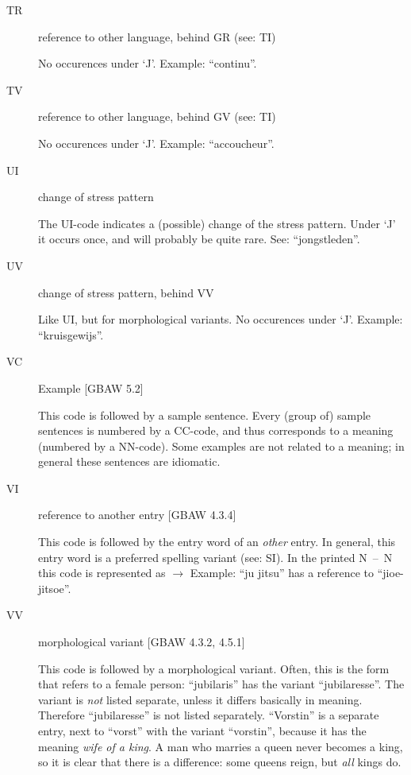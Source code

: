 \begin{description}
   \item [TR] reference to other language, behind GR (see: TI)

        No occurences under `J'. Example: ``continu''.

   \item [TV] reference to other language, behind GV (see: TI)

        No occurences under `J'. Example: ``accoucheur''.

   \item [UI] change of stress pattern

        The UI-code indicates a (possible) change of the stress pattern.
        Under `J' it occurs once, and will probably be quite rare. See:
        ``jongstleden''.

   \item [UV] change of stress pattern, behind VV  

        Like UI, but for morphological variants. No occurences under `J'.
        Example: ``kruisgewijs''.

   \item [VC] Example [GBAW 5.2]
 
        This code is followed by a sample sentence. Every (group of) sample
        sentences is numbered by a CC-code, and thus corresponds to a 
        meaning (numbered by a NN-code). Some examples are not related to 
        a meaning; in general these sentences are idiomatic.

   \item [VI] reference to another entry [GBAW 4.3.4]

        This code is followed by the entry word of an {\em other} entry. In
        general, this entry word is a preferred spelling variant (see: SI).
        In the printed N~--~N this code is represented as $\rightarrow$
        Example: ``ju jitsu'' has a reference to ``jioe-jitsoe''.

   \item [VV] morphological variant [GBAW 4.3.2, 4.5.1]

        This code is followed by a morphological variant. Often, this is the
        form that refers to a female person: ``jubilaris'' has the
        variant ``jubilaresse''. The variant is {\em not} listed separate, 
        unless
        it differs basically in meaning. Therefore ``jubilaresse'' is not listed
        separately. ``Vorstin'' is a separate entry, next to ``vorst'' with the
        variant ``vorstin'', because it has the meaning {\em wife of a king}.
        A man who marries a queen never becomes a king, so it is clear that
        there is a difference: some queens reign, but {\em all} kings do.


\end{description}
